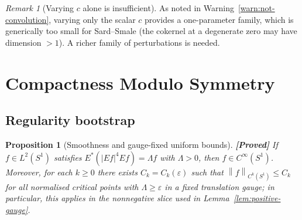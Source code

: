 \documentclass[12pt]{article}
\newtheorem{proposition}[theorem]{Proposition}
\theoremstyle{definition}
\theoremstyle{remark}
\newtheorem{remark}[theorem]{Remark}
\newcommand{\norm}[1]{\left\|#1\right\|}
\newcommand{\proven}{\textbf{\color{teal}[Proved]}}
\begin{document}
\begin{remark}[Varying $c$ alone is insufficient]
  As noted in Warning~\ref{warn:not-convolution}, varying only the scalar
  $c$ provides a one-parameter family, which is generically too small for
  Sard--Smale (the cokernel at a degenerate zero may have dimension
  $>1$).  A richer family of perturbations is needed.
\end{remark}

\section{Compactness Modulo Symmetry}
\label{sec:compactness}

\subsection{Regularity bootstrap}

\begin{proposition}[Smoothness and gauge-fixed uniform bounds]
  \label{prop:bootstrap}
  \proven\quad
  If $f\in L^2(S^1)$ satisfies $E^*(|Ef|^4Ef)=\Lambda f$ with
  $\Lambda>0$, then $f\in C^\infty(S^1)$.  Moreover, for each
  $k\geq 0$ there exists $C_k=C_k(\varepsilon)$ such that
  $\norm{f}_{C^k(S^1)}\leq C_k$ for all normalised critical points
  with $\Lambda\geq\varepsilon$ in a fixed translation gauge; in
  particular, this applies in the nonnegative slice used in
  Lemma~\ref{lem:positive-gauge}.
\end{proposition}
\end{document}
